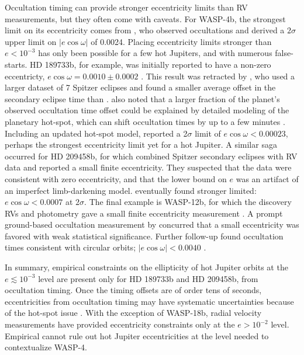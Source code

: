 \documentclass[12pt,twocolumn,tighten]{aastex62}
\begin{document}
Occultation timing can provide stronger eccentricity limits than RV
measurements, but they often come with caveats.  For WASP-4b, the
strongest limit on its eccentricity comes from
\citet{beerer_secondary_2011}, who observed occultations and derived a
$2\sigma$ upper limit on $| e\cos\omega | $ of 0.0024.
Placing eccentricity limits stronger than $e< 10^{-3}$ has only been
possible for a few hot Jupiters, and with numerous false-starts.
HD 189733b, for example, was initially reported to have a non-zero
eccentricty, $e\cos\omega = 0.0010 \pm 0.0002$
\citep{knutson_map_2007}.  This result was retracted by
\citet{agol_climate_2010}, who used a larger dataset of 7 Spitzer
eclipses and found a smaller average offset in the secondary eclipse
time than \citet{knutson_map_2007}.  \citet{agol_climate_2010} also
noted that a larger fraction of the planet's observed occultation time
offset could be explained by detailed modeling of the planetary
hot-spot, which can shift occultation times by up to a few
minutes \citep{williams_resolving_2006}.  Including an updated
hot-spot model, \citet{agol_climate_2010} reported a 2$\sigma$ limit
of $e\cos\omega < 0.00023$, perhaps the strongest eccentricity limit yet
for a hot Jupiter.  A similar saga occurred for HD 209458b, for which
\citet{winn_measurement_2005} combined Spitzer secondary eclipses with
RV data and reported a small finite eccentricity.  They suspected that
the data were consistent with zero eccentricity, and that the lower
bound on $e$ was an artifact of an imperfect limb-darkening model.
\citet{crossfield_spitzer_mips_2012} eventually found stronger limited:
$e\cos\omega < 0.0007$ at $2\sigma$.  The final example is WASP-12b, for
which the discovery RVs and photometry gave a small finite eccentricity
measurement \citep[][at $3\sigma$]{hebb_wasp-12b_2009}.  A prompt
ground-based occultation measurement by
\citet{lopez-morales_day-side_2010} concurred that a small eccentricity
was favored with weak statistical significance. Further follow-up found
occultation times consistent with circular orbits; $| e\cos\omega| <
0.0040 $ \citep{campo_orbit_2011,croll_near-infrared_2011}.

In summary, empirical constraints on the ellipticity of hot Jupiter
orbits at the $e \lesssim 10^{-3}$ level are present only for HD 189733b
and HD 209458b, from occultation timing.  Once the timing offsets are of
order tens of seconds, eccentricities from occultation timing may have
systematic uncertainties because of the hot-spot issue
\citep{williams_resolving_2006,agol_climate_2010}.  With the exception
of WASP-18b, radial velocity measurements have provided eccentricity
constraints only at the $e > 10^{-2}$ level.  Empirical cannot rule out
hot Jupiter eccentricities at the level needed to contextualize WASP-4.
\end{document}
